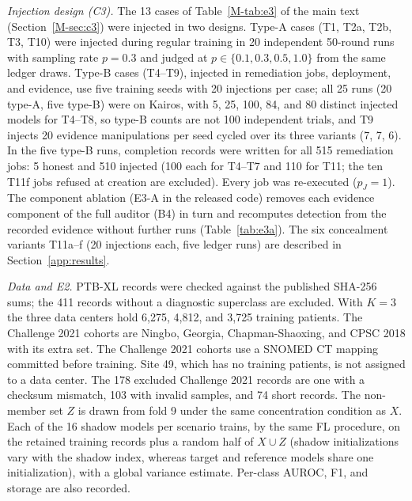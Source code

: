 \emph{Injection design (C3).} The 13 cases of Table~\ref{M-tab:e3} of the main text (Section~\ref{M-sec:c3}) were injected in two designs. Type-A cases (T1, T2a, T2b, T3, T10) were injected during regular training in 20 independent 50-round runs with sampling rate $p=0.3$ and judged at $p\in\{0.1,0.3,0.5,1.0\}$ from the same ledger draws. Type-B cases (T4--T9), injected in remediation jobs, deployment, and evidence, use five training seeds with 20 injections per case; all 25 runs (20 type-A, five type-B) were on Kairos, with 5, 25, 100, 84, and 80 distinct injected models for T4--T8, so type-B counts are not 100 independent trials, and T9 injects 20 evidence manipulations per seed cycled over its three variants (7, 7, 6). In the five type-B runs, completion records were written for all 515 remediation jobs: 5 honest and 510 injected (100 each for T4--T7 and 110 for T11; the ten T11f jobs refused at creation are excluded). Every job was re-executed ($p_J=1$). The component ablation (E3-A in the released code) removes each evidence component of the full auditor (B4) in turn and recomputes detection from the recorded evidence without further runs (Table~\ref{tab:e3a}). The six concealment variants T11a--f (20 injections each, five ledger runs) are described in Section~\ref{app:results}.

\emph{Data and E2.} PTB-XL records were checked against the published SHA-256 sums; the 411 records without a diagnostic superclass are excluded. With $K=3$ the three data centers hold 6{,}275, 4{,}812, and 3{,}725 training patients. The Challenge 2021 cohorts are Ningbo, Georgia, Chapman-Shaoxing, and CPSC 2018 with its extra set. The Challenge 2021 cohorts use a SNOMED CT mapping committed before training. Site 49, which has no training patients, is not assigned to a data center. The 178 excluded Challenge 2021 records are one with a checksum mismatch, 103 with invalid samples, and 74 short records. The non-member set $Z$ is drawn from fold 9 under the same concentration condition as $X$. Each of the 16 shadow models per scenario trains, by the same FL procedure, on the retained training records plus a random half of $X\cup Z$ (shadow initializations vary with the shadow index, whereas target and reference models share one initialization), with a global variance estimate. Per-class AUROC, F1, and storage are also recorded.

